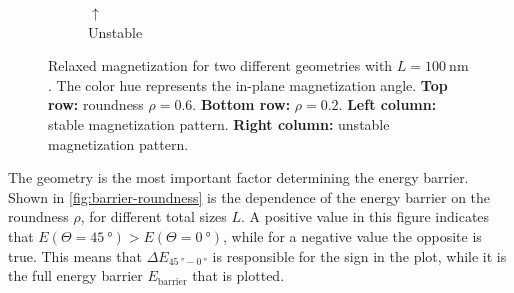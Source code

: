 \documentclass[11pt,a4paper,english,twoside]{article}
\begin{document}
\begin{figure}
\begin{subfigure}[b]{0.2\textwidth}
         \caption*{$\uparrow$\\Unstable}
         \label{fig:barrier-magnetization-20x100_ortho}
     \end{subfigure}
    \caption{Relaxed magnetization for two different geometries with $L=\SI{100}{\nano\metre}$. The color hue represents the in-plane magnetization angle. \textbf{Top row:} roundness $\rho=0.6$. \textbf{Bottom row:} $\rho=0.2$. \textbf{Left column:} stable magnetization pattern. \textbf{Right column:} unstable magnetization pattern.}
    \label{fig:barrier-magnetization}
\end{figure}
The geometry is the most important factor determining the energy barrier. Shown in \cref{fig:barrier-roundness} is the dependence of the energy barrier on the roundness $\rho$, for different total sizes $L$. A positive value in this figure indicates that $E(\Theta=\SI{45}{\degree}) > E(\Theta=\SI{0}{\degree})$, while for a negative value the opposite is true. This means that $\Delta E_{\SI{45}{\degree}-\SI{0}{\degree}}$ is responsible for the sign in the plot, while it is the full energy barrier $E_\mathrm{barrier}$ that is plotted. \par
\end{document}
